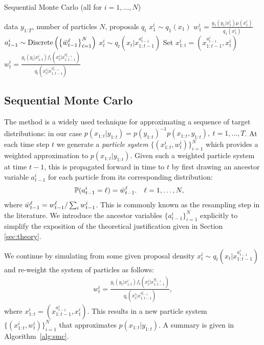 %
%

\begin{algorithm}[tb]
	\caption{Sequential Monte Carlo \hfill {\small (all for $i=1,\ldots,N$)}}
	\label{alg:smc}
	\begin{spacing}{1.2}
		\begin{algorithmic}[1]
			 data $y_{1:T}$, number of particles $N$, proposals $q_t$
			\STATE $x_1^i \sim q_1(x_1)$
			\STATE $w_1^i = \frac{g_1(y_1|x_1^i) \mu(x_1^i)}{q_1(x_1^i)}$
			\STATE $a_{t-1}^i \sim \operatorname*{Discrete}\left(\left\{\bar w_{t-1}^{\ell}\right\}_{\ell=1}^N\right)$%
			\STATE $x_t^i \sim q_t(x_t | x_{1:t-1}^{a_{t-1}^i})$ 
			\STATE Set $x_{1:t}^i = (x_{1:t-1}^{a_{t-1}^i},x_t^i)$
			\STATE $w_t^i = \frac{g_t(y_t|x_{1:t}^i) f_t(x_t^i | x_{1:t-1}^{a_{t-1}^i})}{q_t(x_t^i|x_{1:t-1}^{a_{t-1}^i})}$
			\ENDFOR
		\end{algorithmic}
	\end{spacing}
\end{algorithm}

\subsection{Sequential Monte Carlo}
\label{sec:inf:smc:smc}
The \smc method is a widely used technique for approximating a sequence of target distributions: in our case $p(x_{1:t}|y_{1:t}) = p(y_{1:t})^{-1} p(x_{1:t},y_{1:t}), ~t=1,\ldots,T$. 
At each time step $t$ we 
generate a \emph{particle system}
$\{(x_{1:t}^i,w_{t}^i)\}_{i=1}^N$ which provides a weighted approximation  to $p(x_{1:t}|y_{1:t})$. Given such a weighted particle system at time $t-1$, this 
is propagated forward in time to $t$ by first drawing an ancestor variable $a_{t-1}^i$ for each particle from its corresponding distribution:
\begin{align}
	\mathbb{P}(a_{t-1}^i = \ell) &= \bar w_{t-1}^\ell.
	&
	\ell&=1,\ldots,N,
\end{align}
where $\bar w_{t-1}^\ell = w_{t-1}^\ell / \sum_i w_{t-1}^i$. This is commonly known as the resampling step in the literature. We introduce the ancestor variables $\{a_{t-1}^i\}_{i=1}^N$ explicitly to simplify the exposition of the theoretical justification given in Section \ref{sec:theory}.

We continue by simulating from some given proposal density $x_t^i \sim q_t(x_t | x_{1:t-1}^{a_{t-1}^i})$ and re-weight the system of particles as follows:
\begin{align}
	\label{eq:smcweights}
	w_t^i = \frac{g_t(y_t|x_{1:t}^i) f_t(x_t^i | x_{1:t-1}^{a_{t-1}^i})}{q_t(x_t^i|x_{1:t-1}^{a_{t-1}^i})},
\end{align}
where $x_{1:t}^i = (x_{1:t-1}^{a_{t-1}^i},x_t^i)$. This results in a new particle system $\{(x_{1:t}^i,w_t^i)\}_{i=1}^N$ that approximates $p(x_{1:t}|y_{1:t})$. A summary is given in Algorithm~\ref{alg:smc}.

